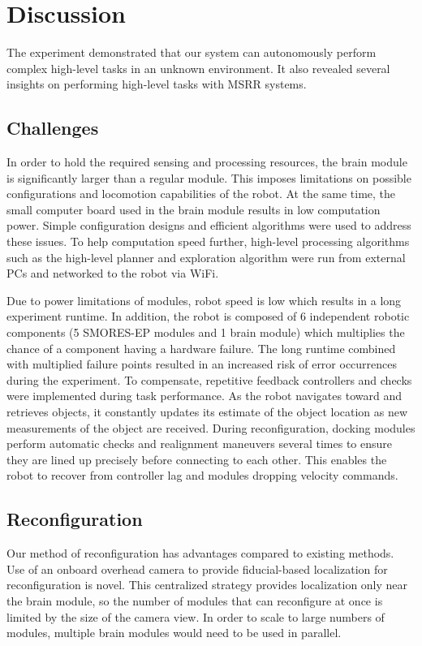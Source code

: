 \documentclass[conference]{IEEEtran}
\begin{document}
\section{Discussion}
\label{sec:discussion}
%
The experiment demonstrated that our system can autonomously perform complex high-level tasks in an unknown environment. It also revealed several insights on performing high-level tasks with MSRR systems.
\subsection{Challenges}

In order to hold the required sensing and processing resources, the brain module is significantly larger than a regular module. This imposes limitations on possible configurations and locomotion capabilities of the robot. At the same time, the small computer board used in the brain module results in low computation power. Simple configuration designs and efficient algorithms were used to address these issues. To help computation speed further, high-level processing algorithms such as the high-level planner and exploration algorithm were run from external PCs and networked to the robot via WiFi.

Due to power limitations of modules, robot speed is low which results in a long experiment runtime. In addition, the robot is composed of 6 independent robotic components (5 SMORES-EP modules and 1 brain module) which multiplies the chance of a component having a hardware failure. The long runtime combined with multiplied failure points resulted in an increased risk of error occurrences during the experiment. To compensate, repetitive feedback controllers and checks were implemented during task performance. As the robot navigates toward and retrieves objects, it constantly updates its estimate of the object location as new measurements of the object are received. During reconfiguration, docking modules perform automatic checks and realignment maneuvers several times to ensure they are lined up precisely before connecting to each other. This enables the robot to recover from controller lag and modules dropping velocity commands.

%
\subsection{Reconfiguration}
Our method of reconfiguration has advantages compared to existing methods.  Use of an onboard overhead camera to provide fiducial-based localization for reconfiguration is novel.  This centralized strategy provides localization only near the brain module, so the number of modules that can reconfigure at once is limited by the size of the camera view. In order to scale to large numbers of modules, multiple brain modules would need to be used in parallel.
\end{document}
